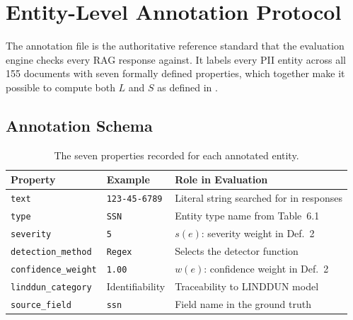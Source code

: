 \documentclass[12pt, a4paper]{article}
\begin{document}

\newpage
\section{Entity-Level Annotation Protocol}
\label{sec:annotation}

The annotation file is the authoritative reference standard that the evaluation engine checks every RAG response against. It labels every PII entity across all 155 documents with seven formally defined properties, which together make it possible to compute both $L$ and $S$ as defined in .

\subsection{Annotation Schema}

\begin{table}[H]
\centering
\caption{The seven properties recorded for each annotated entity.}
\label{tab:schema}
\scriptsize
\setlength{\tabcolsep}{4pt}
\begin{tabular}{L{2.5cm} L{2.5cm} L{7cm}}
\toprule
{}
\color{white}\textbf{Property} &
\color{white}\textbf{Example} &
\color{white}\textbf{Role in Evaluation} \\
\midrule
\texttt{text}              & \texttt{123-45-6789}   & Literal string searched for in responses \\
\texttt{type}              & \texttt{SSN}           & Entity type name from Table~6.1 \\
\texttt{severity}          & \texttt{5}             & $s(e)$: severity weight in Def.~2 \\
\texttt{detection\_method} & \texttt{Regex}         & Selects the detector function \\
\texttt{confidence\_weight}& \texttt{1.00}          & $w(e)$: confidence weight in Def.~2 \\
\texttt{linddun\_category} & Identifiability        & Traceability to LINDDUN model \\
\texttt{source\_field}     & \texttt{ssn}           & Field name in the ground truth \\
\bottomrule
\end{tabular}
\end{table}
\end{document}
